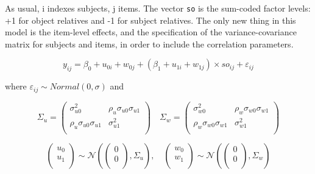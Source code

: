 \documentclass[
  12pt,
]{krantz}
\theoremstyle{definition}
\theoremstyle{definition}
\theoremstyle{definition}
\theoremstyle{definition}
\theoremstyle{remark}
\begin{document}
As usual, i indexes subjects, j items. The vector \texttt{so} is the sum-coded factor levels: +1 for object relatives and -1 for subject relatives. The only new thing in this model is the item-level effects, and the specification of the variance-covariance matrix for subjects and items, in order to include the correlation parameters.

\begin{equation}
y_{ij} = \beta_0 + u_{0i} + w_{0j} + (\beta_1 + u_{1i} + w_{1j}) \times so_{ij} + \varepsilon_{ij}
\end{equation}

where \(\varepsilon_{ij} \sim Normal(0,\sigma)\) and

\begin{equation}\label{eq:covmatLM}
\Sigma_u
=
\begin{pmatrix}
\sigma _{u0}^2  & \rho _{u}\sigma _{u0}\sigma _{u1}\\
\rho _{u}\sigma _{u0}\sigma _{u1}    & \sigma _{u1}^2\\
\end{pmatrix}
\quad 
\Sigma _w
=
\begin{pmatrix}
\sigma _{w0}^2  & \rho _{w}\sigma _{w0}\sigma _{w1}\\
\rho _{w}\sigma _{w0}\sigma _{w1}    & \sigma _{w1}^2\\
\end{pmatrix}
\end{equation}

\begin{equation}\label{eq:jointpriordistLM}
\begin{pmatrix}
  u_0 \\ 
  u_1 \\
\end{pmatrix}
\sim 
\mathcal{N} \left(
\begin{pmatrix}
  0 \\
  0 \\
\end{pmatrix},
\Sigma_{u}
\right),
\quad
\begin{pmatrix}
  w_0 \\ 
  w_1 \\
\end{pmatrix}
\sim 
\mathcal{N}\left(
\begin{pmatrix}
  0 \\
  0 \\
\end{pmatrix},
\Sigma_{w}
\right)
\end{equation}
\end{document}
